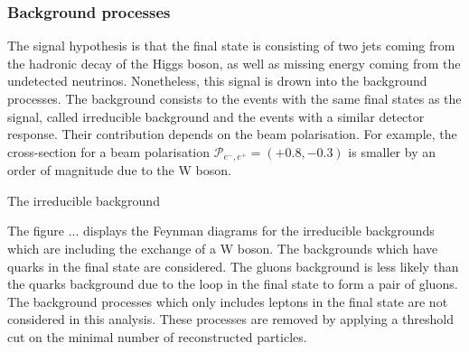   \subsubsection{Background processes}

    The signal hypothesis is that the final state is consisting of two jets coming from the hadronic decay of the Higgs boson, as well as missing energy coming from the undetected neutrinos.
    Nonetheless, this signal is drown into the background processes.
    The background consists to the events with the same final states as the signal, called irreducible background and the events with a similar detector response.
    Their contribution depends on the beam polarisation.
    For example, the cross-section for a beam polarisation $\mathcal{P}_{e^-,e^+} = (+0.8,-0.3)$ is smaller by an order of magnitude due to the W boson.

    The irreducible background 

    The figure ... displays the Feynman diagrams for the irreducible backgrounds which are including the exchange of a W boson.
    The backgrounds which have quarks in the final state are considered.
    The gluons background is less likely than the quarks background due to the loop in the final state to form a pair of gluons.
    The background processes which only includes leptons in the final state are not considered in this analysis.
    These processes are removed by applying a threshold cut on the minimal number of reconstructed particles.


